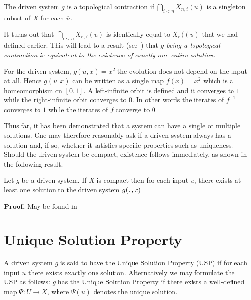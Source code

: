 \begin{Definition}
  \label{Dfn_topContr}\rm
  The driven system $g$ is a topological contraction if $\bigcap_{i<n}X_{n,i}(\overline{u})$ is a singleton subset of $X$ for each $\overline{u}$. 
\end{Definition}

It turns out that $\bigcap_{i<n}X_{n,i}(\overline{u})$ is identically equal to $X_n((\overline{u})$ that we had defined earlier. This will lead to a result (see~\cite{manjunath2013echo}) that 
\textit{$g$ being a topological contraction is equivalent to the existence of exactly one entire solution.}

\begin{Remark}
  \label{rem_proofEx} \rm
  For the driven system,  
  $g(u,x)=x^2$ the evolution does not depend on the input at all. Hence $g(u,x)$ can be written as a single map $f(x)=x^2$ which is a homeomorphism on $[0,1]$. 
  A left-infinite orbit is defined and it converges to $1$ while the right-infinite orbit converges to $0$. 
  In other words the iterates of $f^{-1}$ converges to $1$ while the iterates of $f$ converge to $0$ 
\end{Remark}

Thus far, it has been demonstrated that a system can have a single or multiple solutions. One may therefore reasonably ask if a driven system always has a solution and, if so, whether it satisfies specific properties such as uniqueness. 
Should the driven system be compact, existence follows immediately, as shown in the following result.

\begin{Theorem}\label{Thm_CompactExistence}
 Let $g$ be a driven system.  If $X$ is compact then for each input $\overline{u}$, there exists at least one solution to the driven system $g(\ldotp, x)$
\end{Theorem}
\vspace{-6mm}
{\bf Proof.} May be found in~\cite{kloeden2011nonautonomous, manjunath2014dynamics, manjunath2013echo}


\section{Unique Solution Property}

\begin{Definition}
  \label{Dfn_usp}\rm
  A driven system $g$ is said to have the Unique Solution Property (USP) if for each input $\overline{u}$ there exists exactly one solution. 
  Alternatively we may formulate the USP as follows: $g$ has the Unique Solution Property if there exists a well-defined map $\Psi:{U}\to{X}$, where $\Psi({\overline{u}})$ denotes the unique solution.
\end{Definition}

